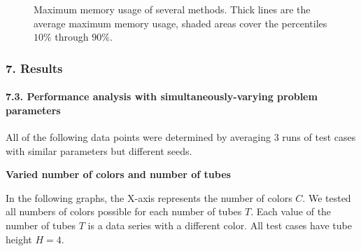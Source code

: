 \documentclass{beamer}
\begin{document}
\begin{frame}
\begin{figure}
    \caption{Maximum memory usage of several methods. Thick lines are the average maximum memory usage, shaded areas cover the percentiles $10\%$ through $90\%$.}
  \end{figure}

\end{frame}

\begin{frame}
  \frametitle{7. Results}
  \framesubtitle{7.3. Performance analysis with simultaneously-varying problem parameters}

  All of the following data points were determined by averaging 3 runs of test cases with similar parameters but different seeds.

  \textbf{Varied number of colors and number of tubes}

  In the following graphs, the X-axis represents the number of colors $C$.
  We tested all numbers of colors possible for each number of tubes $T$.
  Each value of the number of tubes $T$ is a data series with a different color.
  All test cases have tube height $H=4$.
\end{frame}
\end{document}
